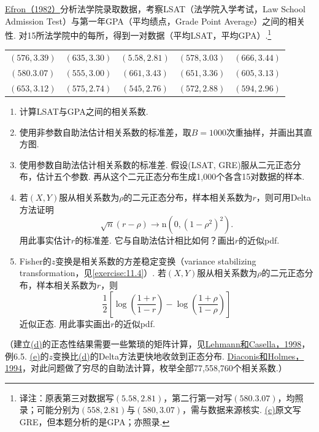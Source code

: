 \begin{exercise}\label{exercise:10.17}
\hyperref[bib:source108]{Efron（1982）}分析法学院录取数据，考察LSAT（法学院入学考试，Law School Admission Test）与第一年GPA（平均绩点，Grade Point Average）之间的相关性. 对15所法学院中的每所，得到一对数据（平均LSAT，平均GPA）.\footnote{译注：原表第三对数据写$(5.58,2.81)$，第二行第一对写$(580.3.07)$，均照录；可能分别为$(558,2.81)$与$(580,3.07)$，需与数据来源核实. \hyperref[itm:exercise:10.17:c]{(c)}原文写GRE，但本题分析的是GPA；亦照录.}
\begin{center}\small
\begin{tabular}{ccccc}
$(576,3.39)$&$(635,3.30)$&$(5.58,2.81)$&$(578,3.03)$&$(666,3.44)$\\
$(580.3.07)$&$(555,3.00)$&$(661,3.43)$&$(651,3.36)$&$(605,3.13)$\\
$(653,3.12)$&$(575,2.74)$&$(545,2.76)$&$(572,2.88)$&$(594,2.96)$
\end{tabular}
\end{center}
\begin{enumerate}[label=(\alph*)]
\item 计算LSAT与GPA之间的相关系数.
\item 使用非参数自助法估计相关系数的标准差，取$B=1000$次重抽样，并画出其直方图.
\item{}\label{itm:exercise:10.17:c} 使用参数自助法估计相关系数的标准差. 假设(LSAT, GRE)服从二元正态分布，估计五个参数. 再从这个二元正态分布生成1,000个各含15对数据的样本.
\item\label{item:10.17.d} 若$(X,Y)$服从相关系数为$\rho$的二元正态分布，样本相关系数为$r$，则可用Delta方法证明
$$\sqrt n(r-\rho)\longrightarrow\mathrm n(0,(1-\rho^2)^2).$$
用此事实估计$r$的标准差. 它与自助法估计相比如何？画出$r$的近似pdf.
\item\label{item:10.17.e} Fisher的$z$变换是相关系数的方差稳定变换（variance stabilizing transformation，见\autoref{exercise:11.4}）. 若$(X,Y)$服从相关系数为$\rho$的二元正态分布，样本相关系数为$r$，则
$$\frac12\left[\log\left(\frac{1+r}{1-r}\right)-\log\left(\frac{1+\rho}{1-\rho}\right)\right]$$
近似正态. 用此事实画出$r$的近似pdf.
\end{enumerate}
（建立\hyperref[item:10.17.d]{(d)}的正态性结果需要一些繁琐的矩阵计算，见\hyperref[bib:source200]{Lehmann和Casella，1998}，例6.5. \hyperref[item:10.17.e]{(e)}的$z$变换比\hyperref[item:10.17.d]{(d)}的Delta方法更快地收敛到正态分布. \hyperref[bib:source99]{Diaconis和Holmes，1994}，对此问题做了穷尽的自助法计算，枚举全部77,558,760个相关系数.）
\end{exercise}

